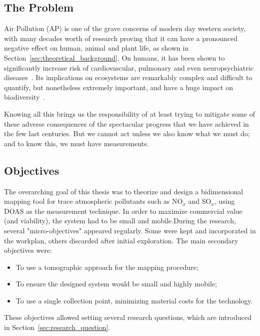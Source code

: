 \subsection{The Problem}%
\label{sub:the_problem}

Air Pollution (\gls{AP}) is one of the grave concerns of modern day
western society, with many decades worth of research proving that it can
have a pronounced negative effect on human, animal and plant life, as
shown in Section~\ref{sec:theoretical_background}. On humans, it has
been shown to significantly increase risk of cardiovascular, pulmonary
and even neuropsychiatric diseases~\cite{Carugno2016, Ghorani-Azam2016,
Kampa2008}. Its implications on ecosystems are remarkably complex and
difficult to quantify, but nonetheless extremely important, and have a
huge impact on biodiversity~\cite{Lovett2009}.

Knowing all this brings us the responsibility of at least trying to
mitigate some of these adverse consequences of the spectacular progress
that we have achieved in the few last centuries. But we cannot act
unless we also know what we must do; and to know this, we must have
measurements.

\subsection{Objectives}%
\label{sub:objectives}

The overarching goal of this thesis was to theorize and design a
bidimensional mapping tool for trace atmospheric pollutants such as
NO$_x$ and SO$_x$, using DOAS as the measurement technique. In order to
maximize commercial value (and viability), the system had to be small
and mobile.During the research, several "micro-objectives" appeared
regularly. Some were kept and incorporated in the workplan, others
discarded after initial exploration. The main secondary objectives were:

\begin{itemize}
    \item To use a tomographic approach for the mapping procedure;
    \item To ensure the designed system would be small and highly
        mobile;
    \item To use a single collection point, minimizing material costs
        for the technology.

\end{itemize}

These objectives allowed setting several research questions, which are
introduced in Section~\ref{sec:research_question}.


